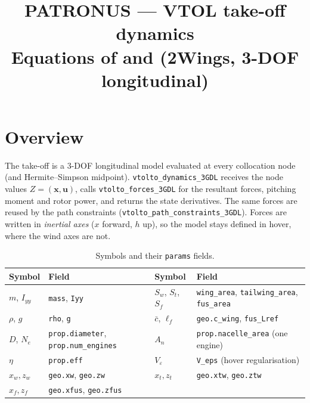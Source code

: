\documentclass[10pt,a4paper]{article}
\title{\vspace{-1.2cm}PATRONUS --- VTOL take-off dynamics\\[2pt]
\large Equations of \code{vtolto\_forces\_3GDL} and \code{vtolto\_dynamics\_3GDL} (2Wings, 3-DOF longitudinal)}
\author{}
\date{\vspace{-1.2cm}}
\newcommand{\code}[1]{\texttt{\small #1}}
\begin{document}
\maketitle

\section{Overview}

The take-off is a 3-DOF longitudinal model evaluated at every collocation node
(and Hermite--Simpson midpoint). \code{vtolto\_dynamics\_3GDL} receives the node values
$Z = (\mathbf{x}, \mathbf{u})$, calls \code{vtolto\_forces\_3GDL} for the resultant forces, pitching moment and
rotor power, and returns the state derivatives. The same forces are reused by the path constraints
(\code{vtolto\_path\_constraints\_3GDL}). Forces are written in \emph{inertial axes} ($x$ forward, $h$ up),
so the model stays defined in hover, where the wind axes are not.

\begin{center}
\end{center}

\begin{table}[h]
\centering\small
\caption{Symbols and their \code{params} fields.}
\begin{tabular}{@{}llll@{}}
\toprule
Symbol & Field & Symbol & Field \\
\midrule
$m$, $I_{yy}$ & \code{mass}, \code{Iyy} & $S_w$, $S_t$, $S_f$ & \code{wing\_area}, \code{tailwing\_area}, \code{fus\_area} \\
$\rho$, $g$ & \code{rho}, \code{g} & $\bar c$, $\ell_f$ & \code{geo.c\_wing}, \code{fus\_Lref} \\
$D$, $N_e$ & \code{prop.diameter}, \code{prop.num\_engines} & $A_n$ & \code{prop.nacelle\_area} (one engine) \\
$\eta$ & \code{prop.eff} & $V_\varepsilon$ & \code{V\_eps} (hover regularisation) \\
$x_w, z_w$ & \code{geo.xw}, \code{geo.zw} & $x_t, z_t$ & \code{geo.xtw}, \code{geo.ztw} \\
$x_f, z_f$ & \code{geo.xfus}, \code{geo.zfus} & & \\
\bottomrule
\end{tabular}
\end{table}
\end{document}
